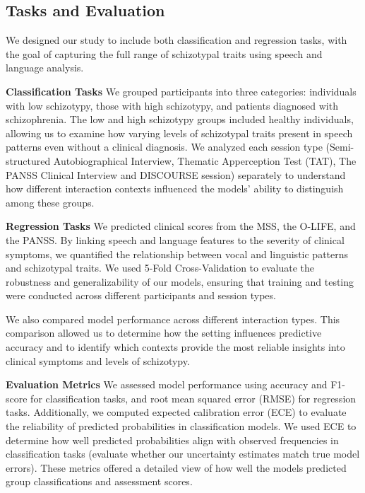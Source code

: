 \documentclass[9pt,a4paper]{rho-class/rho}
\begin{document}
\subsection{Tasks and Evaluation}

We designed our study to include both classification and regression tasks, with the goal of capturing the full range of schizotypal traits using speech and language analysis.

\textbf{Classification Tasks} We grouped participants into three categories: individuals with low schizotypy, those with high schizotypy, and patients diagnosed with schizophrenia. The low and high schizotypy groups included healthy individuals, allowing us to examine how varying levels of schizotypal traits present in speech patterns even without a clinical diagnosis. We analyzed each session type (Semi-structured Autobiographical Interview, Thematic Apperception Test (TAT), The PANSS Clinical Interview and DISCOURSE session) separately to understand how different interaction contexts influenced the models' ability to distinguish among these groups.

\textbf{Regression Tasks} We predicted clinical scores from the MSS, the O-LIFE, and the PANSS. By linking speech and language features to the severity of clinical symptoms, we quantified the relationship between vocal and linguistic patterns and schizotypal traits. We used 5-Fold Cross-Validation to evaluate the robustness and generalizability of our models, ensuring that training and testing were conducted across different participants and session types.

We also compared model performance across different interaction types. This comparison allowed us to determine how the setting influences predictive accuracy and to identify which contexts provide the most reliable insights into clinical symptoms and levels of schizotypy.

\textbf{Evaluation Metrics}
We assessed model performance using accuracy and F1-score for classification tasks, and root mean squared error (RMSE) for regression tasks. Additionally, we computed expected calibration error (ECE) to evaluate the reliability of predicted probabilities in classification models. We used ECE to determine how well predicted probabilities align with observed frequencies in classification tasks (evaluate whether our uncertainty estimates match true model errors). These metrics offered a detailed view of how well the models predicted group classifications and assessment scores. 
\end{document}
